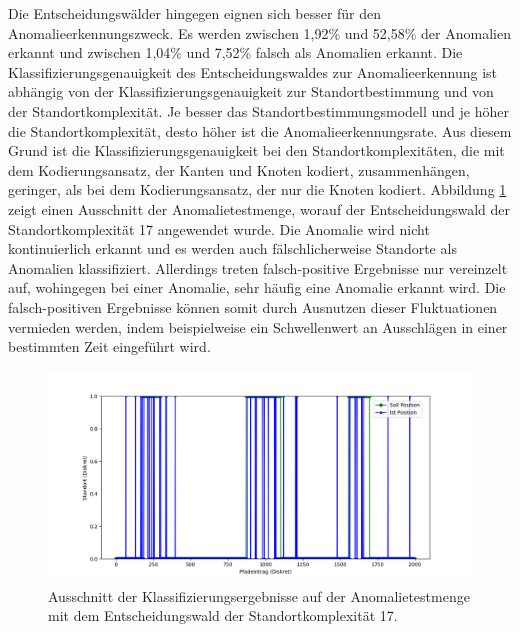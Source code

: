\newpage
Die Entscheidungswälder hingegen eignen sich besser für den Anomalieerkennungszweck.
Es werden zwischen 1,92\% und 52,58\% der Anomalien erkannt und zwischen 1,04\% und 7,52\% falsch als Anomalien erkannt.
Die Klassifizierungsgenauigkeit des Entscheidungswaldes zur Anomalieerkennung ist abhängig von der Klassifizierungsgenauigkeit zur Standortbestimmung
und von der Standortkomplexität.
Je besser das Standortbestimmungsmodell und je höher die Standortkomplexität, desto höher ist die Anomalieerkennungsrate.
Aus diesem Grund ist die Klassifizierungsgenauigkeit bei den Standortkomplexitäten, die mit dem Kodierungsansatz, der Kanten und Knoten kodiert, zusammenhängen,
geringer, als bei dem Kodierungsansatz, der nur die Knoten kodiert.
\newline
\newline
Abbildung \ref{fig:true_vs_predicted_anomaly} zeigt einen Ausschnitt der Anomalietestmenge, worauf der Entscheidungswald der Standortkomplexität 17 angewendet wurde.
Die Anomalie wird nicht kontinuierlich erkannt und es werden auch fälschlicherweise Standorte als Anomalien klassifiziert.
Allerdings treten falsch-positive Ergebnisse nur vereinzelt auf, wohingegen bei einer Anomalie, sehr häufig eine Anomalie erkannt wird.
Die falsch-positiven Ergebnisse können somit durch Ausnutzen dieser Fluktuationen vermieden werden,
indem beispielweise ein Schwellenwert an Ausschlägen in einer bestimmten Zeit eingeführt wird.
\begin{figure}[h!]
    \centering
    \includegraphics[width=\linewidth]{images/anomaly_true_vs_predicted.png}
    \caption{Ausschnitt der Klassifizierungsergebnisse auf der Anomalietestmenge mit dem Entscheidungswald der Standortkomplexität 17. }
    \label{fig:true_vs_predicted_anomaly}
\end{figure}